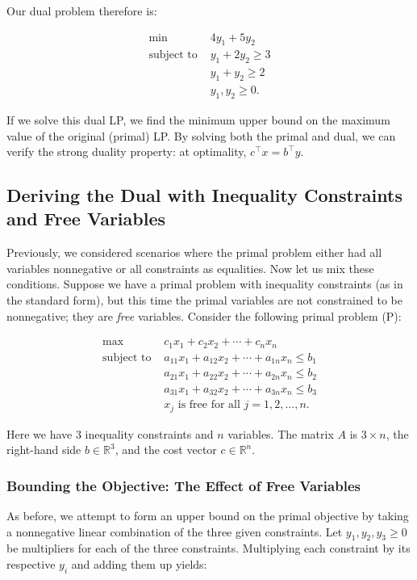 Our dual problem therefore is:

\[
\begin{aligned}
\min \; & 4y_1 + 5y_2 \\
\text{subject to } & y_1 + 2y_2 \geq 3 \\
& y_1 + y_2 \geq 2 \\
& y_1, y_2 \geq 0.
\end{aligned}
\]

If we solve this dual LP, we find the minimum upper bound on the maximum value of the original (primal) LP. By solving both the primal and dual, we can verify the strong duality property: at optimality, $c^\top x = b^\top y$.


\subsection{Deriving the Dual with Inequality Constraints and Free Variables}

Previously, we considered scenarios where the primal problem either had all variables nonnegative or all constraints as equalities. Now let us mix these conditions. Suppose we have a primal problem with inequality constraints (as in the standard form), but this time the primal variables are not constrained to be nonnegative; they are \emph{free} variables. Consider the following primal problem (P):

\[
\begin{aligned}
\max \; & c_1x_1 + c_2x_2 + \cdots + c_n x_n \\
\text{subject to } & a_{11}x_1 + a_{12}x_2 + \cdots + a_{1n}x_n \leq b_1 \\
& a_{21}x_1 + a_{22}x_2 + \cdots + a_{2n}x_n \leq b_2 \\
& a_{31}x_1 + a_{32}x_2 + \cdots + a_{3n}x_n \leq b_3 \\
& x_j \text{ is free for all } j = 1, 2, \ldots, n.
\end{aligned}
\]

Here we have 3 inequality constraints and $n$ variables. The matrix $A$ is $3 \times n$, the right-hand side $b \in \mathbb{R}^3$, and the cost vector $c \in \mathbb{R}^n$.

\subsubsection*{Bounding the Objective: The Effect of Free Variables}

As before, we attempt to form an upper bound on the primal objective by taking a nonnegative linear combination of the three given constraints. Let $y_1, y_2, y_3 \geq 0$ be multipliers for each of the three constraints. Multiplying each constraint by its respective $y_i$ and adding them up yields:

